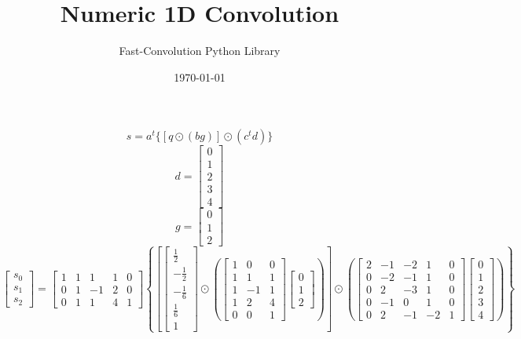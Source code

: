 \documentclass{article}%
\title{Numeric 1D Convolution}%
\author{Fast{-}Convolution Python Library}%
\date{\today}%
\begin{document}
%
\normalsize%
\maketitle%
\[%
s = a^t \{[q \odot (bg)] \odot (c^t d)\}%
\]%
\[%
d = \left[\begin{matrix}0\\1\\2\\3\\4\end{matrix}\right]%
\]%
\[%
g = \left[\begin{matrix}0\\1\\2\end{matrix}\right]%
\]%
\[%
\left[\begin{matrix}s_{0}\\s_{1}\\s_{2}\end{matrix}\right] = \left[\begin{matrix}1 & 1 & 1 & 1 & 0\\0 & 1 & -1 & 2 & 0\\0 & 1 & 1 & 4 & 1\end{matrix}\right] \left\{ \left[ \left[\begin{matrix}\frac{1}{2}\\- \frac{1}{2}\\- \frac{1}{6}\\\frac{1}{6}\\1\end{matrix}\right] \odot \left( \left[\begin{matrix}1 & 0 & 0\\1 & 1 & 1\\1 & -1 & 1\\1 & 2 & 4\\0 & 0 & 1\end{matrix}\right] \left[\begin{matrix}0\\1\\2\end{matrix}\right] \right) \right] \odot \left( \left[\begin{matrix}2 & -1 & -2 & 1 & 0\\0 & -2 & -1 & 1 & 0\\0 & 2 & -3 & 1 & 0\\0 & -1 & 0 & 1 & 0\\0 & 2 & -1 & -2 & 1\end{matrix}\right] \left[\begin{matrix}0\\1\\2\\3\\4\end{matrix}\right] \right) \right\}%
\]%
\end{document}
